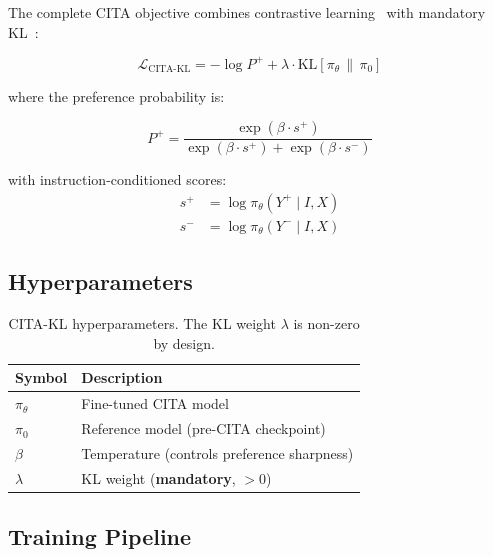 The complete CITA objective combines contrastive learning~\cite{oord2018representation,gao2021simcse,radford2021learning} with mandatory KL~\cite{korbak2022rl}:

\begin{equation}
\mathcal{L}_{\text{CITA-KL}} = -\log P^+ + \lambda \cdot \text{KL}[\pi_\theta \,\|\, \pi_0]
\label{eq:cita_kl}
\end{equation}

where the preference probability is:

\begin{equation}
P^+ = \frac{\exp(\beta \cdot s^+)}{\exp(\beta \cdot s^+) + \exp(\beta \cdot s^-)}
\label{eq:preference_prob}
\end{equation}

with instruction-conditioned scores:
\begin{align}
s^+ &= \log \pi_\theta(Y^+ \mid I, X) \label{eq:score_pos} \\
s^- &= \log \pi_\theta(Y^- \mid I, X) \label{eq:score_neg}
\end{align}

\vspace{-2mm}
\subsection{Hyperparameters}
\label{sec:cita_hyperparams}

\begin{table}[H]
\centering
\small
\begin{tabular}{@{}ll@{}}
\toprule
\textbf{Symbol} & \textbf{Description} \\
\midrule
$\pi_\theta$ & Fine-tuned CITA model \\
$\pi_0$ & Reference model (pre-CITA checkpoint) \\
$\beta$ & Temperature (controls preference sharpness) \\
$\lambda$ & KL weight (\textbf{mandatory}, $> 0$) \\
\bottomrule
\end{tabular}
\caption{CITA-KL hyperparameters. The KL weight $\lambda$ is non-zero by design.}
\label{tab:cita_params}
\vspace{-4mm}
\end{table}

\vspace{-2mm}
\subsection{Training Pipeline}
\label{sec:training_pipeline}

